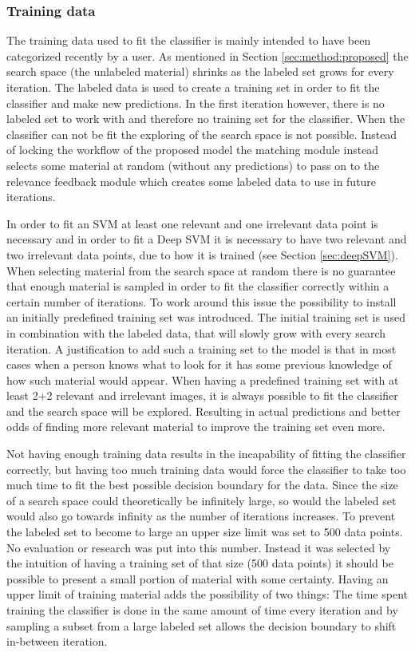 \subsubsection{Training data}
\label{sec:method:proposed:matching:training}
The training data used to fit the classifier is mainly intended to have been categorized recently by a user. As mentioned in Section \ref{sec:method:proposed} the search space (the  unlabeled material) shrinks as the labeled set grows for every iteration. The labeled data is used to create a training set in order to fit the classifier and make new predictions. 
In the first iteration however, there is no labeled set to work with and therefore no training set for the classifier. When the classifier can not be fit the exploring of the search space is not possible. Instead of locking the workflow of the proposed model the matching module instead selects some material at random (without any predictions) to pass on to the relevance feedback module which creates some labeled data to use in future iterations.

In order to fit an SVM at least one relevant and one irrelevant data point is necessary and in order to fit a Deep SVM it is necessary to have two relevant and two irrelevant data points, due to how it is trained (see Section \ref{sec:deepSVM}). When selecting material from the search space at random there is no guarantee that enough material is sampled in order to fit the classifier correctly within a certain number of iterations. 
To work around this issue the possibility to install an initially predefined training set was introduced. The initial training set is used in combination with the labeled data, that will slowly grow with every search iteration. A justification to add such a training set to the model is that in most cases when a person knows what to look for it has some previous knowledge of how such material would appear. When having a predefined training set with at least 2+2 relevant and irrelevant images, it is always possible to fit the classifier and the search space will be explored. Resulting in actual predictions and better odds of finding more relevant material to improve the training set even more.

Not having enough training data results in the incapability of fitting the classifier correctly, but having too much training data would force the classifier to take too much time to fit the best possible decision boundary for the data. Since the size of a search space could theoretically be infinitely large, so would the labeled set would also go towards infinity as the number of iterations increases. To prevent the labeled set to become to large an upper size limit was set to 500 data points. No evaluation or research was put into this number. Instead it was selected by the intuition of having a training set of that size (500 data points) it should be possible to present a small portion of material with some certainty. Having an upper limit of training material adds the possibility of two things: The time spent training the classifier is done in the same amount of time every iteration and by sampling a subset from a large labeled set allows the decision boundary to shift in-between iteration.

